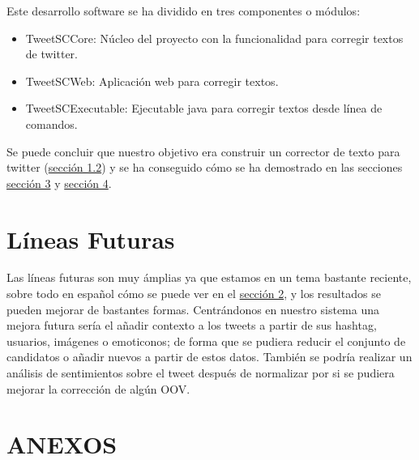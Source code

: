 \documentclass[spanish,12pt, a4paper,twoside]{paper}
\let\oldsection\section
\def\section{\cleardoublepage\oldsection}
\begin{document}
Este desarrollo software se ha dividido en tres componentes o módulos:
\begin{itemize}
	\item TweetSCCore: Núcleo del proyecto con la funcionalidad para corregir textos de twitter.
	\item TweetSCWeb: Aplicación web para corregir textos.
	\item TweetSCExecutable: Ejecutable java para corregir textos desde línea de comandos.
\end{itemize}
Se puede concluir que nuestro objetivo era construir un corrector de texto para twitter (\hyperref[sec:objetivos]{sección 1.2}) y se ha conseguido cómo se ha demostrado en las secciones \hyperref[sec:solucionpropuesta]{sección 3} y \hyperref[sec:implementacion]{sección 4}.

\section{Líneas Futuras}\label{sec:lineasfuturas}
Las líneas futuras son muy ámplias ya que estamos en un tema bastante reciente, sobre todo en español cómo se puede ver en el \hyperref[sec:estadodelarte]{sección 2}, y los resultados se pueden mejorar de bastantes formas. Centrándonos en nuestro sistema una mejora futura sería el añadir contexto a los tweets a partir de sus hashtag, usuarios, imágenes o emoticonos; de forma que se pudiera reducir el conjunto de candidatos o añadir nuevos a partir de estos datos. También se podría realizar un análisis de sentimientos sobre el tweet después de normalizar por si se pudiera mejorar la corrección de algún OOV.

\section*{ANEXOS}
\end{document}
